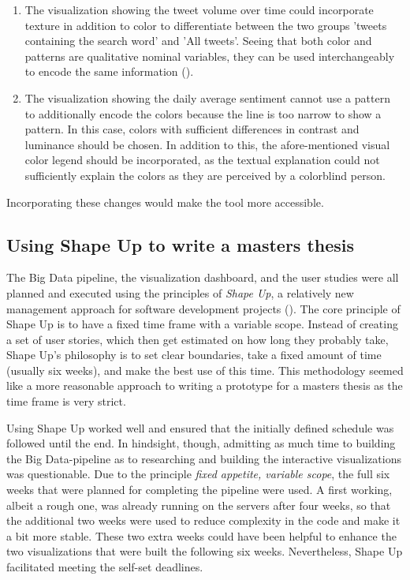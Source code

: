 \begin{enumerate}
    \item The visualization showing the tweet volume over time could incorporate texture in addition to color to differentiate between the two groups 'tweets containing the search word' and 'All tweets'. Seeing that both color and patterns are qualitative nominal variables, they can be used interchangeably to encode the same information (\cite{bornerDataVisualizationLiteracy2019}). %
    \item The visualization showing the daily average sentiment cannot use a pattern to additionally encode the colors because the line is too narrow to show a pattern. In this case, colors with sufficient differences in contrast and luminance should be chosen. In addition to this, the afore-mentioned visual color legend should be incorporated, as the textual explanation could not sufficiently explain the colors as they are perceived by a colorblind person.
\end{enumerate}

Incorporating these changes would make the tool more accessible.

\subsection*{Using Shape Up to write a masters thesis} \label{sec:shape_up}
The Big Data pipeline, the visualization dashboard, and the user studies were all planned and executed using the principles of \emph{Shape Up}, a relatively new management approach for software development projects (\cite{singerShapeStopRunning2019}). The core principle of Shape Up is to have a fixed time frame with a variable scope. Instead of creating a set of user stories, which then get estimated on how long they probably take, Shape Up's philosophy is to set clear boundaries, take a fixed amount of time (usually six weeks), and make the best use of this time. This methodology seemed like a more reasonable approach to writing a prototype for a masters thesis as the time frame is very strict.

Using Shape Up worked well and ensured that the initially defined schedule was followed until the end. In hindsight, though, admitting as much time to building the Big Data-pipeline as to researching and building the interactive visualizations was questionable. Due to the principle \emph{fixed appetite, variable scope}, the full six weeks that were planned for completing the pipeline were used. A first working, albeit a rough one, was already running on the   servers after four weeks, so that the additional two weeks were used to reduce complexity in the code and make it a bit more stable. These two extra weeks could have been helpful to enhance the two visualizations that were built the following six weeks. Nevertheless, Shape Up facilitated meeting the self-set deadlines.

